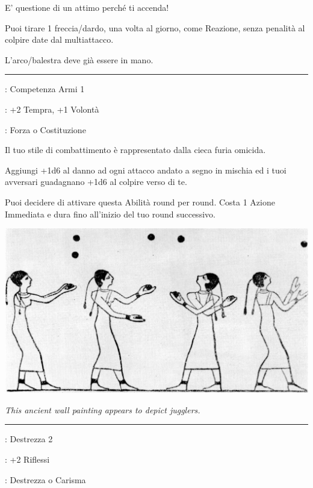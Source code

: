 \begin{multicols}{2}
E' questione di un attimo perché ti accenda!

Puoi tirare 1 freccia/dardo, una volta al giorno, come Reazione, senza penalità al colpire date dal multiattacco.

L'arco/balestra deve già essere in mano.

\smallskip\noindent\rule{\linewidth}{2pt} \hypertarget{Furia}{}\medskip{}
\noindent
\begin{description}[noitemsep, topsep=0pt, parsep=0pt, partopsep=0pt, leftmargin=0cm, labelwidth=2.5cm]
    \item[\textbf{Requisito}]: Competenza Armi 1
    \item[\textbf{Tiri Salvezza}]: +2 Tempra, +1 Volontà
    \item[\textbf{Caratteristica}]: Forza o Costituzione
\end{description}

Il tuo stile di combattimento è rappresentato dalla cieca furia omicida.

Aggiungi +1d6 al danno ad ogni attacco andato a segno in mischia ed i tuoi avversari guadagnano +1d6 al colpire verso di te.

Puoi decidere di attivare questa Abilità round per round. Costa 1 Azione Immediata e dura fino all'inizio del tuo round successivo.


\begin{center}
	\includegraphics[width=0.9\linewidth]{immagini/Early_Egyptian_juggling_art.png}

	\emph{This ancient wall painting appears to depict jugglers.}
\end{center}

\smallskip\noindent\rule{\linewidth}{2pt} \hypertarget{Giocoliere}{}\medskip{}
\noindent
\begin{description}[noitemsep, topsep=0pt, parsep=0pt, partopsep=0pt, leftmargin=0cm, labelwidth=2.5cm]
    \item[\textbf{Requisito}]: Destrezza 2
    \item[\textbf{Tiri Salvezza}]: +2 Riflessi
    \item[\textbf{Caratteristica}]: Destrezza o Carisma
\end{description}


\end{multicols}
